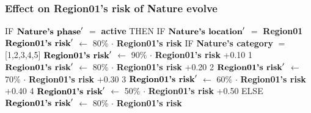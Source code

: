 \documentclass{article}%
\begin{document}
%
\subsubsection{Effect on Region01's risk of Nature evolve}%
\label{ssubsec:Effect on Region01's risk of Nature evolve}%
\begin{flushleft}%
IF %
$\mbox{\textbf{Nature's phase}} '$%
$=$%
\textbf{active}%
\linebreak%
\hspace*{2em}%
THEN %
IF %
$\mbox{\textbf{Nature's location}} '$%
$=$%
\textbf{Region01}%
\linebreak%
\hspace*{4em}%
$\mbox{\textbf{Region01's risk}} '$%
$\leftarrow$%
80\%%
$\cdot$%
\textbf{Region01's risk}%
\linebreak%
\hspace*{4em}%
IF %
\textbf{Nature's category}%
$=$%
{[}1,2,3,4,5{]}%
\linebreak%
\hspace*{6em}%
$\mbox{\textbf{Region01's risk}} '$%
$\leftarrow$%
90\%%
$\cdot$%
\textbf{Region01's risk}%
+0.10%
\linebreak%
\hspace*{6em}%
1 %
$\mbox{\textbf{Region01's risk}} '$%
$\leftarrow$%
80\%%
$\cdot$%
\textbf{Region01's risk}%
+0.20%
\linebreak%
\hspace*{6em}%
2 %
$\mbox{\textbf{Region01's risk}} '$%
$\leftarrow$%
70\%%
$\cdot$%
\textbf{Region01's risk}%
+0.30%
\linebreak%
\hspace*{6em}%
3 %
$\mbox{\textbf{Region01's risk}} '$%
$\leftarrow$%
60\%%
$\cdot$%
\textbf{Region01's risk}%
+0.40%
\linebreak%
\hspace*{6em}%
4 %
$\mbox{\textbf{Region01's risk}} '$%
$\leftarrow$%
50\%%
$\cdot$%
\textbf{Region01's risk}%
+0.50%
\linebreak%
\hspace*{2em}%
ELSE %
$\mbox{\textbf{Region01's risk}} '$%
$\leftarrow$%
80\%%
$\cdot$%
\textbf{Region01's risk}%
\end{flushleft}

%
\end{document}
